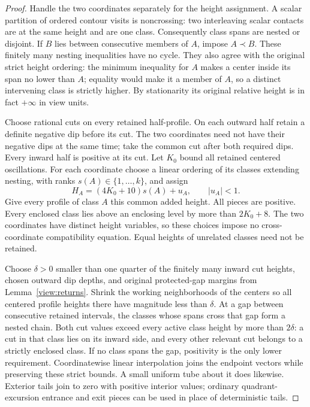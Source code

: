 \begin{proof}
Handle the two coordinates separately for the height assignment.  A
scalar partition of ordered contour visits is noncrossing: two
interleaving scalar contacts are at the same height and are one class.
Consequently class spans are nested or disjoint.  If $B$ lies between
consecutive members of $A$, impose $A\prec B$.  These finitely many
nesting inequalities have no cycle.  They also agree with the original
strict height ordering: the minimum inequality for $A$ makes a center
inside its span no lower than $A$; equality would make it a member of
$A$, so a distinct intervening class is strictly higher.  By stationarity
its original relative height is in fact $+\infty$ in view units.

Choose rational cuts on every retained half-profile.  On each outward
half retain a definite negative dip before its cut.  The two coordinates
need not have their negative dips at the same time; take the common cut
after both required dips.  Every inward half is positive at its cut.
Let $K_0$ bound all retained centered oscillations.  For each coordinate
choose a linear ordering of its classes extending nesting, with ranks
$s(A)\in\{1,\ldots,k\}$, and assign
\[
 H_A=(4K_0+10)s(A)+u_A,\qquad |u_A|<1.
\]
Give every profile of class $A$ this common added height.  All pieces
are positive.  Every enclosed class lies above an enclosing level by
more than $2K_0+8$.  The two coordinates have distinct height variables,
so these choices impose no cross-coordinate compatibility equation.
Equal heights of unrelated classes need not be retained.

Choose $\delta>0$ smaller than one quarter of the finitely many inward
cut heights, chosen outward dip depths, and original protected-gap
margins from Lemma~\ref{view:returns}.  Shrink the working neighborhoods
of the centers so all centered profile heights there have magnitude
less than $\delta$.  At a gap between consecutive retained intervals,
the classes whose spans cross that gap form a nested chain.  Both cut
values exceed every active class height by more than $2\delta$: a cut
in that class lies on its inward side, and every other relevant cut
belongs to a strictly enclosed class.  If no class spans the gap,
positivity is the only lower requirement.  Coordinatewise linear
interpolation joins the endpoint vectors while preserving these strict
bounds.  A small uniform tube about it does likewise.  Exterior tails
join to zero with positive interior values; ordinary quadrant-excursion
entrance and exit pieces can be used in place of deterministic tails.


\end{proof}
